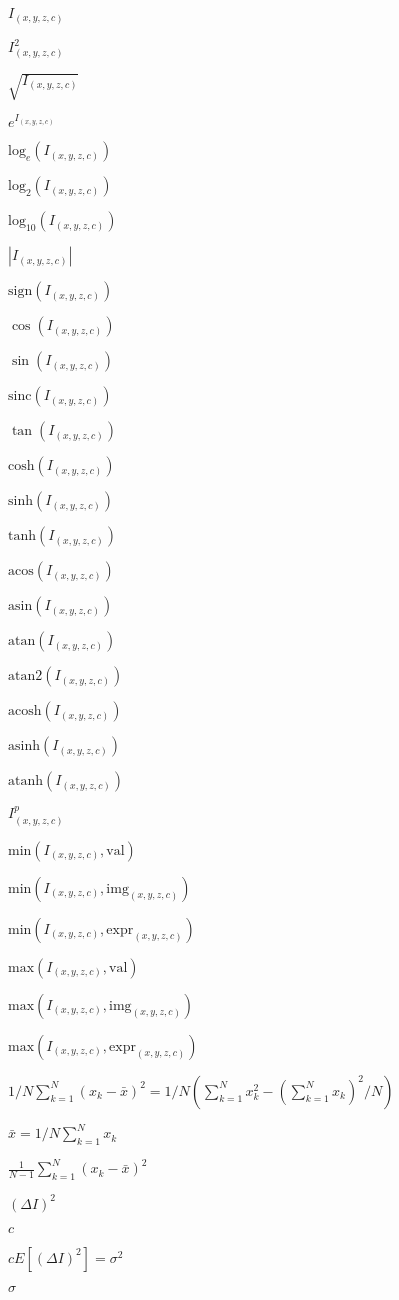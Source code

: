 \documentclass{article}
\begin{document}
$I_{(x,y,z,c)}$
\pagebreak

$I_{(x,y,z,c)}^2$
\pagebreak

$\sqrt{I_{(x,y,z,c)}}$
\pagebreak

$e^{I_{(x,y,z,c)}}$
\pagebreak

$\mathrm{log}_{e}(I_{(x,y,z,c)})$
\pagebreak

$\mathrm{log}_{2}(I_{(x,y,z,c)})$
\pagebreak

$\mathrm{log}_{10}(I_{(x,y,z,c)})$
\pagebreak

$|I_{(x,y,z,c)}|$
\pagebreak

$\mathrm{sign}(I_{(x,y,z,c)})$
\pagebreak

$\cos(I_{(x,y,z,c)})$
\pagebreak

$\sin(I_{(x,y,z,c)})$
\pagebreak

$\mathrm{sinc}(I_{(x,y,z,c)})$
\pagebreak

$\tan(I_{(x,y,z,c)})$
\pagebreak

$\mathrm{cosh}(I_{(x,y,z,c)})$
\pagebreak

$\mathrm{sinh}(I_{(x,y,z,c)})$
\pagebreak

$\mathrm{tanh}(I_{(x,y,z,c)})$
\pagebreak

$\mathrm{acos}(I_{(x,y,z,c)})$
\pagebreak

$\mathrm{asin}(I_{(x,y,z,c)})$
\pagebreak

$\mathrm{atan}(I_{(x,y,z,c)})$
\pagebreak

$\mathrm{atan2}(I_{(x,y,z,c)})$
\pagebreak

$\mathrm{acosh}(I_{(x,y,z,c)})$
\pagebreak

$\mathrm{asinh}(I_{(x,y,z,c)})$
\pagebreak

$\mathrm{atanh}(I_{(x,y,z,c)})$
\pagebreak

$I_{(x,y,z,c)}^p$
\pagebreak

$\mathrm{min}(I_{(x,y,z,c)},\mathrm{val})$
\pagebreak

$\mathrm{min}(I_{(x,y,z,c)},\mathrm{img}_{(x,y,z,c)})$
\pagebreak

$\mathrm{min}(I_{(x,y,z,c)},\mathrm{expr}_{(x,y,z,c)})$
\pagebreak

$\mathrm{max}(I_{(x,y,z,c)},\mathrm{val})$
\pagebreak

$\mathrm{max}(I_{(x,y,z,c)},\mathrm{img}_{(x,y,z,c)})$
\pagebreak

$\mathrm{max}(I_{(x,y,z,c)},\mathrm{expr}_{(x,y,z,c)})$
\pagebreak

$1/N \sum\limits_{k=1}^{N} (x_k - \bar x)^2 = 1/N \left( \sum\limits_{k=1}^N x_k^2 - \left( \sum\limits_{k=1}^N x_k \right)^2 / N \right)$
\pagebreak

$ \bar x = 1/N \sum\limits_{k=1}^N x_k $
\pagebreak

$\frac{1}{N - 1} \sum\limits_{k=1}^{N} (x_k - \bar x)^2 $
\pagebreak

$(\Delta I)^2 $
\pagebreak

$c$
\pagebreak

$ c E[(\Delta I)^2]= \sigma^2$
\pagebreak

$\sigma$
\pagebreak
\end{document}
